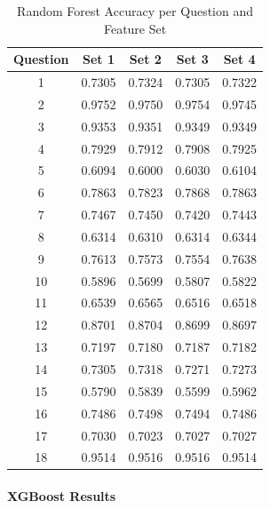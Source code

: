 \documentclass[12pt]{article}
\begin{document}
	\begin{table}[H]
		\centering
		\small
		\caption{Random Forest Accuracy per Question and Feature Set}
		\begin{tabular}{c|cccc}
			\toprule
			\textbf{Question} & \textbf{Set 1} & \textbf{Set 2} & \textbf{Set 3} & \textbf{Set 4} \\
			\midrule
			1  & 0.7305 & 0.7324 & 0.7305 & 0.7322 \\
			2  & 0.9752 & 0.9750 & 0.9754 & 0.9745 \\
			3  & 0.9353 & 0.9351 & 0.9349 & 0.9349 \\
			4  & 0.7929 & 0.7912 & 0.7908 & 0.7925 \\
			5  & 0.6094 & 0.6000 & 0.6030 & 0.6104 \\
			6  & 0.7863 & 0.7823 & 0.7868 & 0.7863 \\
			7  & 0.7467 & 0.7450 & 0.7420 & 0.7443 \\
			8  & 0.6314 & 0.6310 & 0.6314 & 0.6344 \\
			9  & 0.7613 & 0.7573 & 0.7554 & 0.7638 \\
			10 & 0.5896 & 0.5699 & 0.5807 & 0.5822 \\
			11 & 0.6539 & 0.6565 & 0.6516 & 0.6518 \\
			12 & 0.8701 & 0.8704 & 0.8699 & 0.8697 \\
			13 & 0.7197 & 0.7180 & 0.7187 & 0.7182 \\
			14 & 0.7305 & 0.7318 & 0.7271 & 0.7273 \\
			15 & 0.5790 & 0.5839 & 0.5599 & 0.5962 \\
			16 & 0.7486 & 0.7498 & 0.7494 & 0.7486 \\
			17 & 0.7030 & 0.7023 & 0.7027 & 0.7027 \\
			18 & 0.9514 & 0.9516 & 0.9516 & 0.9514 \\
			\bottomrule
		\end{tabular}
		\label{tab:rf_metrics}
	\end{table}
	
	\paragraph{XGBoost Results}\mbox{}\\
	
\end{document}
